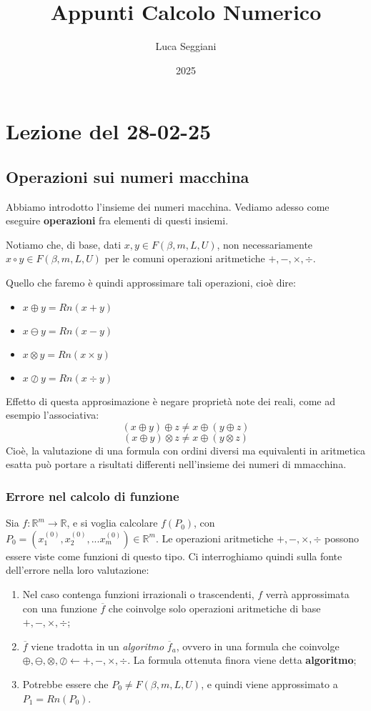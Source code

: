 \documentclass[a4paper,11pt]{article}
\title{Appunti Calcolo Numerico}
\author{Luca Seggiani}
\date{2025}
\begin{document}
\section{Lezione del 28-02-25}

\thispagestyle{empty}
\pagestyle{fancy}

\subsection{Operazioni sui numeri macchina}
Abbiamo introdotto l'insieme dei numeri macchina.
Vediamo adesso come eseguire \textbf{operazioni} fra elementi di questi insiemi.

Notiamo che, di base, dati $x, y \in F(\beta, m, L, U)$, non necessariamente $x \circ y \in F(\beta, m, L, U)$ per le comuni operazioni aritmetiche $+, -, \times, \div$.

Quello che faremo è quindi approssimare tali operazioni, cioè dire:
\begin{itemize}
	\item $x \oplus y = Rn(x + y)$
	\item $x \ominus y = Rn(x - y)$
	\item $x \otimes y = Rn(x \times y)$
	\item $x \oslash y = Rn(x \div y)$
\end{itemize}

Effetto di questa approsimazione è negare proprietà note dei reali, come ad esempio l'associativa:
$$
(x \oplus y) \oplus z \neq x \oplus (y \oplus z)
$$
$$
(x \oplus y) \otimes z \neq x \oplus (y \otimes z)
$$
Cioè, la valutazione di una formula con ordini diversi ma equivalenti in aritmetica esatta può portare a risultati differenti nell'insieme dei numeri di mmacchina.

\subsubsection{Errore nel calcolo di funzione}
Sia $f:\mathbb{R}^m \rightarrow \mathbb{R}$, e si voglia calcolare $f(P_0)$, con $P_0 =\left(x_1^{(0)}, x_2^{(0)}, ...x_m^{(0)}\right) \in \mathbb{R}^m$.
Le operazioni aritmetiche $+, -, \times, \div$ possono essere viste come funzioni di questo tipo.
Ci interroghiamo quindi sulla fonte dell'errore nella loro valutazione:
\begin{enumerate}
	\item Nel caso contenga funzioni irrazionali o trascendenti, $f$ verrà approssimata con una funzione $\overline{f}$ che coinvolge solo operazioni aritmetiche di base $+, -, \times, \div$;
	\item $\overline{f}$ viene tradotta in un \textit{algoritmo} $\overline{f}_a$, ovvero in una formula che coinvolge $\oplus, \ominus, \otimes, \oslash \leftarrow +, -, \times, \div$. La formula ottenuta finora viene detta \textbf{algoritmo};
	\item Potrebbe essere che $P_0 \neq F(\beta, m, L, U)$, e quindi viene approssimato a $P_1 = Rn(P_0)$.
\end{enumerate}
\end{document}
